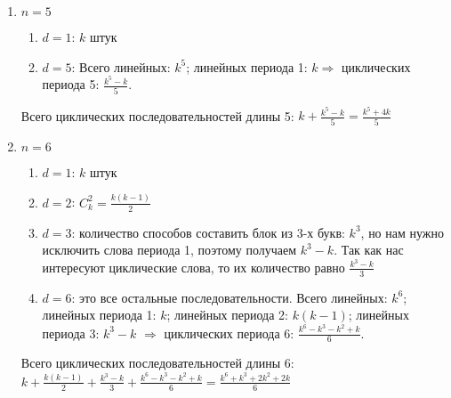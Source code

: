 \begin{enumerate}
\item $n=5$
\begin{enumerate}
    \item $d=1$: $k$ штук
    \item $d=5$: Всего линейных: $k^5$; линейных периода 1: $k \Rightarrow$ циклических периода 5: $\frac{k^5-k}{5}$.
\end{enumerate}
\par Всего циклических последовательностей длины 5: $k+\frac{k^5-k}{5}=\frac{k^5+4k}{5}$
\item $n=6$
\begin{enumerate}
    \item $d=1$: $k$ штук
    \item $d=2$: $C_k^2=\frac{k(k-1)}{2}$
    \item $d=3$: количество способов составить блок из 3-х букв: $k^3$, но нам нужно исключить слова периода 1, поэтому получаем $k^3-k$. Так как нас интересуют циклические слова, то их количество равно $\frac{k^3-k}{3}$
    \item $d=6$: это все остальные последовательности. Всего линейных: $k^6$; линейных периода 1: $k$; линейных периода 2: $k(k-1)$; линейных периода 3: $k^3-k$ $\Rightarrow$ циклических периода 6: $\frac{k^6-k^3-k^2+k}{6}$.
\end{enumerate}
\par Всего циклических последовательностей длины 6: $k+\frac{k(k-1)}{2}+\frac{k^3-k}{3}+\frac{k^6-k^3-k^2+k}{6}=\frac{k^6+k^3+2k^2+2k}{6}$
\end{enumerate}